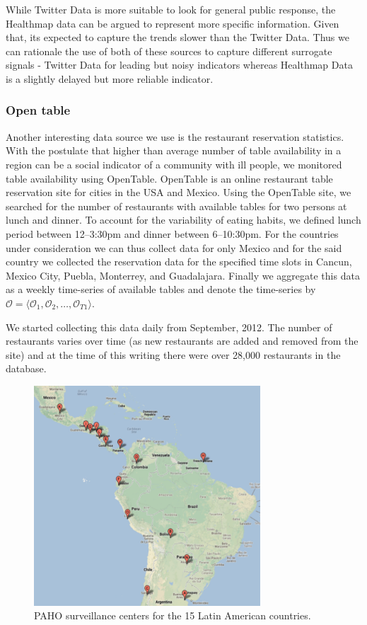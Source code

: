 While Twitter Data is more suitable to look for general public response,
the Healthmap data
can be argued to represent more specific information. Given that, its expected to 
capture the trends slower than the Twitter Data. Thus we can rationale the use of both of 
these sources to capture different surrogate signals - Twitter Data for leading but noisy
indicators whereas Healthmap Data is a slightly delayed but more reliable indicator.

\subsubsection{Open table}
Another interesting data source we use is the restaurant reservation statistics. 
With the postulate that higher than average number of table availability in a 
region can be a social indicator of a community with ill people, we monitored 
table availability using OpenTable\cite{Opentable:2013}. OpenTable is 
an online restaurant table reservation site for cities in the USA and Mexico. 
Using the OpenTable site, we searched for the number of restaurants with available 
tables for two persons at lunch and dinner. To account for the variability 
of eating habits, we defined lunch period between 12–3:30pm and dinner 
between 6–10:30pm. For the countries under consideration we can thus
collect data for only Mexico and for the said country we collected the
reservation data for the specified time slots in Cancun, Mexico City,
Puebla, Monterrey, and Guadalajara. Finally we aggregate this data as a
weekly time-series of available tables and denote the time-series by
$\mathcal{O} = \langle \mathcal{O}_1, \mathcal{O}_2, \dots, \mathcal{O}_{T1} \rangle$.

We started collecting this data daily from September, 2012. The
number of restaurants varies over time (as new restaurants are added and
removed from the site) and at the time of this writing there 
were over 28,000 restaurants in the database.
\begin{figure}
  \includegraphics[width=3.33in]{fig/humidity_centers.pdf}
  \caption{\label{fig:surveillance} PAHO surveillance centers for the 15
  Latin American countries.}
\end{figure}


